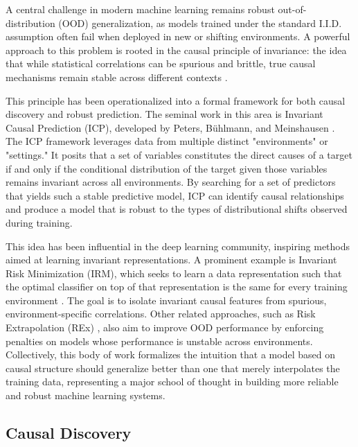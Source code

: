 {A central challenge in modern machine learning remains robust out-of-distribution (OOD) generalization, as models trained under the standard I.I.D. assumption often fail when deployed in new or shifting environments. A powerful approach to this problem is rooted in the causal principle of invariance: the idea that while statistical correlations can be spurious and brittle, true causal mechanisms remain stable across different contexts \cite{pearl2000causality}.

This principle has been operationalized into a formal framework for both causal discovery and robust prediction. The seminal work in this area is Invariant Causal Prediction (ICP), developed by Peters, Bühlmann, and Meinshausen \cite{peters2016invariant}. The ICP framework leverages data from multiple distinct "environments" or "settings." It posits that a set of variables constitutes the direct causes of a target if and only if the conditional distribution of the target given those variables remains invariant across all environments. By searching for a set of predictors that yields such a stable predictive model, ICP can identify causal relationships and produce a model that is robust to the types of distributional shifts observed during training.

This idea has been influential in the deep learning community, inspiring methods aimed at learning invariant representations. A prominent example is Invariant Risk Minimization (IRM), which seeks to learn a data representation such that the optimal classifier on top of that representation is the same for every training environment \cite{arjovsky2019invariant}. The goal is to isolate invariant causal features from spurious, environment-specific correlations. Other related approaches, such as Risk Extrapolation (REx) \cite{krueger2021out}, also aim to improve OOD performance by enforcing penalties on models whose performance is unstable across environments. Collectively, this body of work formalizes the intuition that a model based on causal structure should generalize better than one that merely interpolates the training data, representing a major school of thought in building more reliable and robust machine learning systems.

\newpage

\subsection{Causal Discovery}

}
